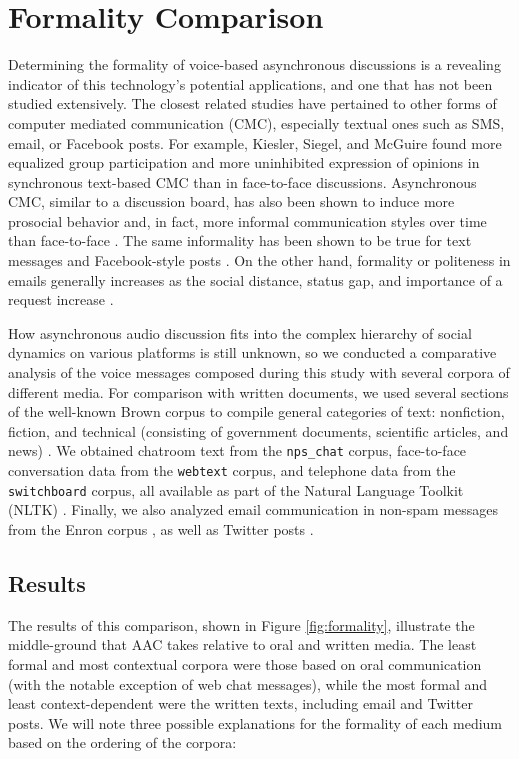 \section{Formality Comparison}
Determining the formality of voice-based asynchronous discussions is a revealing indicator of this technology's potential applications, and one that has not been studied extensively.
The closest related studies have pertained to other forms of computer mediated communication (CMC), especially textual ones such as SMS, email, or Facebook posts.
For example, Kiesler, Siegel, and McGuire \cite{kiesler} found more equalized group participation and more uninhibited expression of opinions in synchronous text-based CMC than in face-to-face discussions.
Asynchronous CMC, similar to a discussion board, has also been shown to induce more prosocial behavior and, in fact, more informal communication styles over time than face-to-face \cite{walther}.
The same informality has been shown to be true for text messages and Facebook-style posts \cite{bilal}.
On the other hand, formality or politeness in emails generally increases as the social distance, status gap, and importance of a request increase \cite{cho}.

How asynchronous audio discussion fits into the complex hierarchy of social dynamics on various platforms is still unknown, so we conducted a comparative analysis of the voice messages composed during this study with several corpora of different media.
For comparison with written documents, we used several sections of the well-known Brown corpus to compile general categories of text: nonfiction, fiction, and technical (consisting of government documents, scientific articles, and news) \cite{brown}.
We obtained chatroom text from the \texttt{nps\_chat} corpus, face-to-face conversation data from the \texttt{webtext} corpus, and telephone data from the \texttt{switchboard} corpus, all available as part of the Natural Language Toolkit (NLTK) \cite{nltk}.
Finally, we also analyzed email communication in non-spam messages from the Enron corpus \cite{enronsent}, as well as Twitter posts \cite{twitter}.

\subsection{Results}
The results of this comparison, shown in Figure \ref{fig:formality}, illustrate the middle-ground that AAC takes relative to oral and written media. 
The least formal and most contextual corpora were those based on oral communication (with the notable exception of web chat messages), while the most formal and least context-dependent were the written texts, including email and Twitter posts. 
We will note three possible explanations for the formality of each medium based on the ordering of the corpora:

